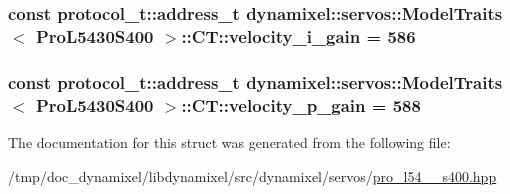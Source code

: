 \subsubsection[{\texorpdfstring{velocity\+\_\+i\+\_\+gain}{velocity_i_gain}}]{\setlength{\rightskip}{0pt plus 5cm}const {\bf protocol\+\_\+t\+::address\+\_\+t} {\bf dynamixel\+::servos\+::\+Model\+Traits}$<$ {\bf Pro\+L5430\+S400} $>$\+::C\+T\+::velocity\+\_\+i\+\_\+gain = 586\hspace{0.3cm}{\ttfamily [static]}}\hypertarget{structdynamixel_1_1servos_1_1_model_traits_3_01_pro_l5430_s400_01_4_1_1_c_t_ac5d0ddb677dcca548851c3d8884d6573}{}\label{structdynamixel_1_1servos_1_1_model_traits_3_01_pro_l5430_s400_01_4_1_1_c_t_ac5d0ddb677dcca548851c3d8884d6573}
\subsubsection[{\texorpdfstring{velocity\+\_\+p\+\_\+gain}{velocity_p_gain}}]{\setlength{\rightskip}{0pt plus 5cm}const {\bf protocol\+\_\+t\+::address\+\_\+t} {\bf dynamixel\+::servos\+::\+Model\+Traits}$<$ {\bf Pro\+L5430\+S400} $>$\+::C\+T\+::velocity\+\_\+p\+\_\+gain = 588\hspace{0.3cm}{\ttfamily [static]}}\hypertarget{structdynamixel_1_1servos_1_1_model_traits_3_01_pro_l5430_s400_01_4_1_1_c_t_a8b2a7d2b0c9a3ab799b06a18dbbf3820}{}\label{structdynamixel_1_1servos_1_1_model_traits_3_01_pro_l5430_s400_01_4_1_1_c_t_a8b2a7d2b0c9a3ab799b06a18dbbf3820}


The documentation for this struct was generated from the following file\+:\begin{DoxyCompactItemize}
\item 
/tmp/doc\+\_\+dynamixel/libdynamixel/src/dynamixel/servos/\hyperlink{pro__l54__30__s400_8hpp}{pro\+\_\+l54\+\_\+\_\+s400.\+hpp}\end{DoxyCompactItemize}
